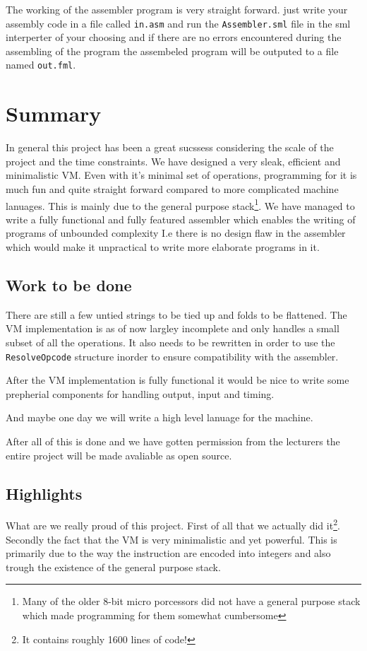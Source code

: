 \documentclass{article}
\newcommand{\V}{\verb}
\begin{document}
The working of the assembler program is very straight forward. just write your
assembly code in a file called \V+in.asm+ and run the \V+Assembler.sml+ file in
the sml interperter of your choosing and if there are no errors encountered during
the assembling of the program the assembeled program will be outputed to a file
named \V+out.fml+.

\section{Summary}
In general this project has been a great sucssess considering the scale of the
project and the time constraints. We have designed a very sleak, efficient and
minimalistic VM. Even with it's minimal set of operations, programming for it is
much fun and quite straight forward compared to more complicated machine
lanuages. This is mainly due to the general purpose stack\footnote{Many of the
older 8-bit micro porcessors did not have a general purpose stack which made
programming for them somewhat cumbersome}.
We have managed to write a fully functional and fully featured assembler which
enables the writing of programs of unbounded complexity I.e there is no design
flaw in the assembler which would make it unpractical to write more elaborate
programs in it.
\subsection{Work to be done}
There are still a few untied strings to be tied up and folds to be flattened.
The VM implementation is as of now largley incomplete and only handles a small subset
of all the operations. It also needs to be rewritten in order to use the
\V+ResolveOpcode+ structure inorder to ensure compatibility with the assembler.

After the VM implementation is fully functional it would be nice to write some
prepherial components for handling output, input and timing.

And maybe one day we will write a high level lanuage for the machine.

After all of this is done and we have gotten permission from the lecturers the
entire project will be made avaliable as open source.
\subsection{Highlights}
What are we really proud of this project. First of all that we actually
did it\footnote{It contains roughly 1600 lines of code!}. Secondly the fact that
the VM is very minimalistic and yet powerful.
This is primarily due to the way the instruction are encoded into integers and
also trough the existence of the general purpose stack.
\end{document}
